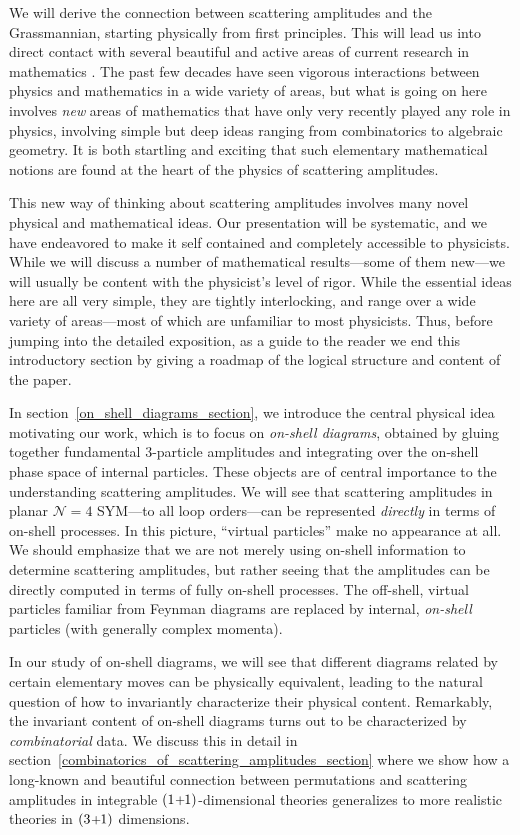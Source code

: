 \documentclass[12pt,hyperref,compress]{JHEP3}
\newcommand{\pl}{\hspace{0.5pt}\text{{\small+}}\hspace{-0.5pt}}
\begin{document}
We will derive the connection between scattering amplitudes and the Grassmannian, starting physically from first principles. This will lead us into direct contact with several beautiful and active areas of current research in mathematics \cite{Lusztig::1998,L2, FZ, FG1, FG2,FG3, P, KLS,GK,T}. The past few decades have seen vigorous interactions between physics and mathematics in a wide variety of areas, but what is going on here involves {\it new} areas of mathematics that have only very recently played any role in physics, involving  simple but deep ideas ranging from combinatorics to algebraic geometry. It is both startling and exciting that such elementary mathematical notions are found at the heart of the physics of scattering amplitudes. 

This new way of thinking about scattering amplitudes involves many novel physical and mathematical ideas. Our presentation will be systematic, and we have endeavored to make it self contained and completely accessible to physicists. While we will discuss a number of mathematical results---some of them new---we will usually be content with the physicist's level of rigor. While the essential ideas here are all very simple, they are tightly interlocking, and range over a wide variety of areas---most of which are unfamiliar to most physicists.  Thus, before jumping into the detailed exposition, as a guide to the reader we end this introductory section by giving a roadmap of the logical structure and content of the paper. 

In \mbox{section \ref{on_shell_diagrams_section}}, we introduce the central physical idea motivating our work, which is to focus on {\it on-shell diagrams}, obtained by gluing together fundamental $3$-particle amplitudes and integrating over the on-shell phase space of internal particles. These objects are of central importance to the understanding scattering amplitudes. We will see that scattering amplitudes in planar $\mathcal{N}\!=\!4$ SYM---to all loop orders---can be represented {\it directly} in terms of on-shell processes. In this picture, ``virtual particles'' make no appearance at all. We should emphasize that we are not merely using on-shell information to determine scattering amplitudes, but rather seeing that the amplitudes can be directly computed in terms of fully on-shell processes. The off-shell, virtual particles familiar from Feynman diagrams are replaced by internal, {\it on-shell} particles (with generally complex momenta).

In our study of on-shell diagrams, we will see that different diagrams related by certain elementary moves can be physically equivalent, leading to the natural question of how to invariantly characterize their physical content. Remarkably, the invariant content of on-shell diagrams turns out to be characterized by {\it combinatorial} data. We discuss this in detail in \mbox{section \ref{combinatorics_of_scattering_amplitudes_section}} where we show how a long-known and beautiful connection between permutations and scattering amplitudes in integrable $(1\pl1)$-dimensional theories generalizes to more realistic theories in $(3\pl1)$ dimensions.
\end{document}
